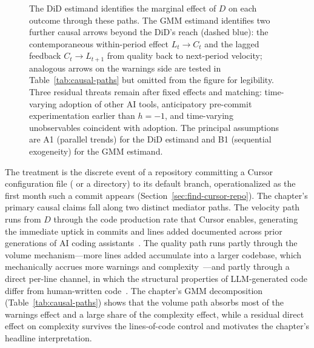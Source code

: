 \begin{figure}
{    The DiD estimand identifies the marginal effect of $D$ on each outcome through these paths.
    The GMM estimand identifies two further causal arrows beyond the DiD's reach (dashed blue): the contemporaneous within-period effect $L_t \to C_t$ and the lagged feedback $C_t \to L_{t+1}$ from quality back to next-period velocity; analogous arrows on the warnings side are tested in Table~\ref{tab:causal-paths} but omitted from the figure for legibility.
    Three residual threats remain after fixed effects and matching: time-varying adoption of other AI tools, anticipatory pre-commit experimentation earlier than $h{=}{-}1$, and time-varying unobservables coincident with adoption.
    The principal assumptions are A1 (parallel trends) for the DiD estimand and B1 (sequential exogeneity) for the GMM estimand.}
    \label{fig:dag-cursor}
\end{figure}

The treatment is the discrete event of a repository committing a Cursor configuration file ( or a  directory) to its default branch, operationalized as the first month such a commit appears (Section~\ref{sec:find-cursor-repo}).
The chapter's primary causal claims fall along two distinct mediator paths.
The velocity path runs from $D$ through the code production rate that Cursor enables, generating the immediate uptick in commits and lines added documented across prior generations of AI coding assistants~\cite{DBLP:journals/corr/abs-2302-06590, cui2025effects, DBLP:journals/corr/abs-2406-17910, hoffmann2024generative, DBLP:conf/icis/YeverechyahuMO24, DBLP:journals/corr/abs-2410-02091, daniotti2025using}.
The quality path runs partly through the volume mechanism---more lines added accumulate into a larger codebase, which mechanically accrues more warnings and complexity~\cite{DBLP:conf/sigsoft/ChengMCJGKZ022, besker2018technical}---and partly through a direct per-line channel, in which the structural properties of LLM-generated code differ from human-written code~\cite{DBLP:journals/tse/LiuTLZZ24, DBLP:conf/icse/Liang0M24}.
The chapter's GMM decomposition (Table~\ref{tab:causal-paths}) shows that the volume path absorbs most of the warnings effect and a large share of the complexity effect, while a residual direct effect on complexity survives the lines-of-code control and motivates the chapter's headline interpretation.


